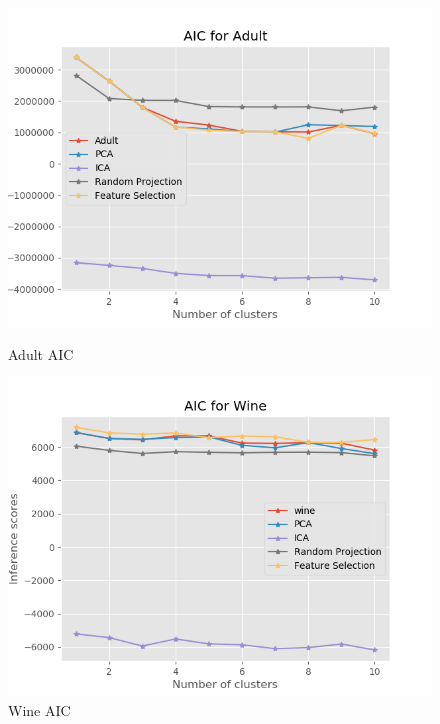 \documentclass[11pt]{article}
\begin{document}
\begin{figure}[!htb]
   \begin{minipage}{0.5\textwidth}
     \centering
     \includegraphics[width=1.2\linewidth]{../figures/cluster_em_aic_adult.png}
     \caption{Adult AIC}\label{Fig:cluster_em_aic_adult}
   \end{minipage}\hfill
   \begin{minipage}{0.5\textwidth}
     \centering
     \includegraphics[width=1.2\linewidth]{../figures/cluster_em_aic_wine.png}
  \caption{Wine AIC}
  \label{Fig:cluster_em_aic_wine}
   \end{minipage}
\end{figure}
\end{document}
